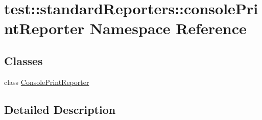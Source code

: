 \hypertarget{namespacetest_1_1standardReporters_1_1consolePrintReporter}{\section{test\-:\-:standard\-Reporters\-:\-:console\-Print\-Reporter \-Namespace \-Reference}
\label{df/d3c/namespacetest_1_1standardReporters_1_1consolePrintReporter}
}
\subsection*{\-Classes}
\begin{DoxyCompactItemize}
\item 
class \hyperlink{classtest_1_1standardReporters_1_1consolePrintReporter_1_1ConsolePrintReporter}{\-Console\-Print\-Reporter}
\end{DoxyCompactItemize}


\subsection{\-Detailed \-Description}
\begin{DoxyVerb}

\end{DoxyVerb}
 